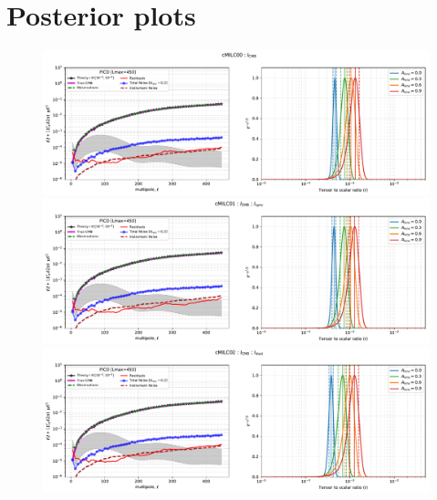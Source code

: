 \documentclass[11pt]{article}
\begin{document}
\section{Posterior plots}
\begin{figure}
\centering
\includegraphics[width=1.2\textwidth]{ps_and_bbposterir_cMILC00.pdf}
\includegraphics[width=1.2\textwidth]{ps_and_bbposterir_cMILC01.pdf}
\includegraphics[width=1.2\textwidth]{ps_and_bbposterir_cMILC02.pdf}
\end{figure}
\end{document}
